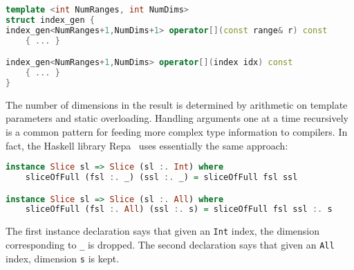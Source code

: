 \begin{singlespace}
\begin{lstlisting}[language=c++,style=ttcode]
template <int NumRanges, int NumDims>
struct index_gen {
index_gen<NumRanges+1,NumDims+1> operator[](const range& r) const
    { ... }

index_gen<NumRanges+1,NumDims> operator[](index idx) const
    { ... }
}
\end{lstlisting}
\end{singlespace}

\noindent
The number of dimensions in the result is determined by arithmetic
on template parameters and static overloading.
Handling arguments one at a time recursively is a common pattern
for feeding more complex type information to compilers.
In fact, the Haskell library Repa~\cite{Keller:2010rs} uses
essentially the same approach:

\begin{singlespace}
\begin{lstlisting}[language=haskell,style=ttcode]
instance Slice sl => Slice (sl :. Int) where
    sliceOfFull (fsl :. _) (ssl :. _) = sliceOfFull fsl ssl

instance Slice sl => Slice (sl :. All) where
    sliceOfFull (fsl :. All) (ssl :. s) = sliceOfFull fsl ssl :. s
\end{lstlisting}
\end{singlespace}

\noindent
The first instance declaration says that given an \texttt{Int} index,
the dimension corresponding to \texttt{\_} is dropped.
The second declaration says that given an \texttt{All} index,
dimension \texttt{s} is kept.

\iffalse
Our goal here is a bit unusual: we are not concerned with which rules
might work best, but merely with how they can be specified, so that
domain experts can experiment.
In fact different domains want different things.
Working with images, each dimension might be quite different, e.g.\ representing
time, space, or color, so you don't want to drop or rearrange dimensions very often.
\fi


